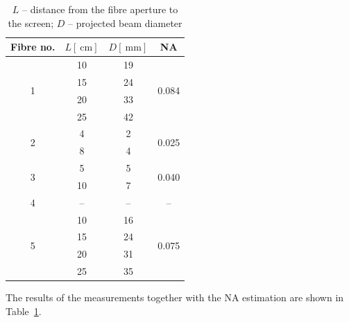 \begin{table}[]
    \centering
    \begin{tabular}{c||c|c||c}
        Fibre no. & $L [\SI{}{\centi\metre}]$ & $D [\SI{}{\milli\metre}]$ & NA\\
        \hline\hline
        \multirow{4}{*}{1} & 10 & 19 & \multirow{4}{*}{0.084}\\
        & 15 & 24 \\
        & 20 & 33 \\
        & 25 & 42 \\
        \hline
        \multirow{2}{*}{2} & 4 & 2 & \multirow{2}{*}{0.025}\\
        & 8 & 4 \\
        \hline
        \multirow{2}{*}{3} & 5 & 5 & \multirow{2}{*}{0.040}\\
        & 10 & 7 \\
        \hline
        4 & -- & -- & -- \\
        \hline
        \multirow{4}{*}{5} & 10 & 16 & \multirow{4}{*}{0.075}\\
        & 15 & 24 \\
        & 20 & 31 \\
        & 25 & 35 \\
    \end{tabular}
    \caption{$L$ -- distance from the fibre aperture to the screen; $D$ -- projected beam diameter}
    \label{tab:NA}
\end{table}


The results of the measurements together with the NA estimation are shown in Table~\ref{tab:NA}.




